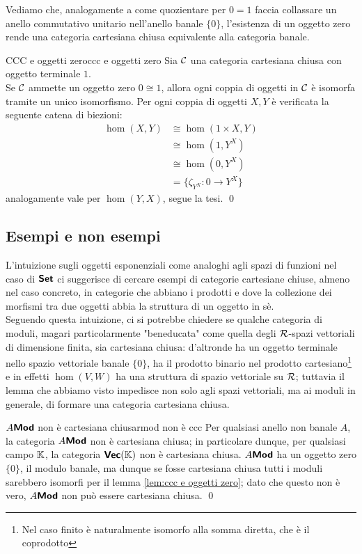 \documentclass[openany]{book}
\renewcommand\C{\mc{C}}
\begin{document}
Vediamo che, analogamente a come quozientare per $0=1$ faccia collassare un anello commutativo unitario nell'anello banale $\{0\}$, l'esistenza di un oggetto zero rende una categoria cartesiana chiusa equivalente alla categoria banale.

\begin{lemma}{CCC e oggetti zero}{ccc e oggetti zero}
    Sia $\C$ una categoria cartesiana chiusa con oggetto terminale $1$.\\
    Se $\C$ ammette un oggetto zero $0 \cong 1$, allora ogni coppia di oggetti in $\C$ è isomorfa tramite un unico isomorfismo.
    \proof 
    Per ogni coppia di oggetti $X,Y$ è verificata la seguente catena di biezioni:
    \begin{align*}
        \hom(X,Y) & \cong \hom(1\times X, Y) \\
        & \cong \hom(1, Y^X) \\
        & \cong \hom(0, Y^X) \\
        & = \{\zeta_{Y^X}: 0 \to Y^X\}
    \end{align*}
    analogamente vale per $\hom(Y,X)$, segue la tesi.
    \qed
\end{lemma}

\subsection{Esempi e non esempi}

L'intuizione sugli oggetti esponenziali come analoghi agli spazi di funzioni nel caso di $\text{\sffamily\textbf{Set}}$ ci suggerisce di cercare esempi di categorie cartesiane chiuse, almeno nel caso concreto, in categorie che abbiano i prodotti e dove la collezione dei morfismi tra due oggetti abbia la struttura di un oggetto in sè.\\
Seguendo questa intuizione, ci si potrebbe chiedere se qualche categoria di moduli, magari particolarmente "beneducata" come quella degli $\mathcal{R}$-spazi vettoriali di dimensione finita, sia cartesiana chiusa: d'altronde ha un oggetto terminale nello spazio vettoriale banale $\{0\}$, ha il prodotto binario nel prodotto cartesiano\footnote{Nel caso finito è naturalmente isomorfo alla somma diretta, che è il coprodotto} e in effetti $\hom(V,W)$ ha una struttura di spazio vettoriale su $\mathcal{R}$; tuttavia il lemma che abbiamo visto impedisce non solo agli spazi vettoriali, ma ai moduli in generale, di formare una categoria cartesiana chiusa.

\begin{example}{$A\text{\sffamily\textbf{Mod}}$ non è cartesiana chiusa}{rmod non è ccc}
    Per qualsiasi anello non banale $A$, la categoria $A\text{\sffamily\textbf{Mod}}$ non è cartesiana chiusa; in particolare dunque, per qualsiasi campo $\mathbb{K}$, la categoria $\text{\sffamily\textbf{Vec}}(\mathbb{K})$ non è cartesiana chiusa.
    \proof 
    $A\text{\sffamily\textbf{Mod}}$ ha un oggetto zero $\{0\}$, il modulo banale, ma dunque se fosse cartesiana chiusa tutti i moduli sarebbero isomorfi per il lemma \cref{lem:ccc e oggetti zero}; dato che questo non è vero, $A\text{\sffamily\textbf{Mod}}$ non può essere cartesiana chiusa.
    \qed
\end{example}
\end{document}
